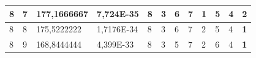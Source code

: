 \documentclass[conference]{IEEEtran}
\begin{document}
\begin{table}[]
\begin{tabular}{|llll|llllllll|}
\multicolumn{1}{|l|}{8}                                                              & \multicolumn{1}{l|}{7}                                                                 & \multicolumn{1}{l|}{177,1666667}                                                           & 7,724E-35                               & \multicolumn{1}{l|}{8}                                                           & \multicolumn{1}{l|}{3}                                                           & \multicolumn{1}{l|}{6}                                                           & \multicolumn{1}{l|}{7}                                                           & \multicolumn{1}{l|}{\textbf{1}}                                                  & \multicolumn{1}{l|}{5}                                                           & \multicolumn{1}{l|}{4}                                                           & 2                                   \\ \hline
\multicolumn{1}{|l|}{8}                                                              & \multicolumn{1}{l|}{8}                                                                 & \multicolumn{1}{l|}{175,5222222}                                                           & 1,7176E-34                              & \multicolumn{1}{l|}{8}                                                           & \multicolumn{1}{l|}{3}                                                           & \multicolumn{1}{l|}{6}                                                           & \multicolumn{1}{l|}{7}                                                           & \multicolumn{1}{l|}{2}                                                           & \multicolumn{1}{l|}{5}                                                           & \multicolumn{1}{l|}{4}                                                           & \textbf{1}                          \\ \hline
\multicolumn{1}{|l|}{8}                                                              & \multicolumn{1}{l|}{9}                                                                 & \multicolumn{1}{l|}{168,8444444}                                                           & 4,399E-33                               & \multicolumn{1}{l|}{8}                                                           & \multicolumn{1}{l|}{3}                                                           & \multicolumn{1}{l|}{5}                                                           & \multicolumn{1}{l|}{7}                                                           & \multicolumn{1}{l|}{2}                                                           & \multicolumn{1}{l|}{6}                                                           & \multicolumn{1}{l|}{4}                                                           & \textbf{1}                          \\ \hline

\end{tabular}
\end{table}
\end{document}
